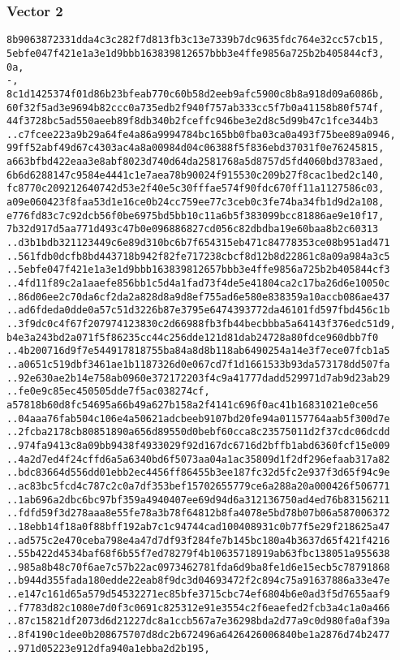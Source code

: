 \documentclass[
]{article}
\begin{document}
\hypertarget{vector-2-2}{%
\subsubsection{Vector 2}\label{vector-2-2}}

\begin{verbatim}
8b9063872331dda4c3c282f7d813fb3c13e7339b7dc9635fdc764e32cc57cb15,
5ebfe047f421e1a3e1d9bbb163839812657bbb3e4ffe9856a725b2b405844cf3,
0a,
-,
8c1d1425374f01d86b23bfeab770c60b58d2eeb9afc5900c8b8a918d09a6086b,
60f32f5ad3e9694b82ccc0a735edb2f940f757ab333cc5f7b0a41158b80f574f,
44f3728bc5ad550aeeb89f8db340b2fceffc946be3e2d8c5d99b47c1fce344b3
..c7fcee223a9b29a64fe4a86a9994784bc165bb0fba03ca0a493f75bee89a0946,
99ff52abf49d67c4303ac4a8a00984d04c06388f5f836ebd37031f0e76245815,
a663bfbd422eaa3e8abf8023d740d64da2581768a5d8757d5fd4060bd3783aed,
6b6d6288147c9584e4441c1e7aea78b90024f915530c209b27f8cac1bed2c140,
fc8770c209212640742d53e2f40e5c30fffae574f90fdc670ff11a1127586c03,
a09e060423f8faa53d1e16ce0b24cc759ee77c3ceb0c3fe74ba34fb1d9d2a108,
e776fd83c7c92dcb56f0be6975bd5bb10c11a6b5f383099bcc81886ae9e10f17,
7b32d917d5aa771d493c47b0e096886827cd056c82dbdba19e60baa8b2c60313
..d3b1bdb321123449c6e89d310bc6b7f654315eb471c84778353ce08b951ad471
..561fdb0dcfb8bd443718b942f82fe717238cbcf8d12b8d22861c8a09a984a3c5
..5ebfe047f421e1a3e1d9bbb163839812657bbb3e4ffe9856a725b2b405844cf3
..4fd11f89c2a1aaefe856bb1c5d4a1fad73f4de5e41804ca2c17ba26d6e10050c
..86d06ee2c70da6cf2da2a828d8a9d8ef755ad6e580e838359a10accb086ae437
..ad6fdeda0dde0a57c51d3226b87e3795e6474393772da46101fd597fbd456c1b
..3f9dc0c4f67f207974123830c2d66988fb3fb44becbbba5a64143f376edc51d9,
b4e3a243bd2a071f5f86235cc44c256dde121d81dab24728a80fdce960dbb7f0
..4b200716d9f7e544917818755ba84a8d8b118ab6490254a14e3f7ece07fcb1a5
..a0651c519dbf3461ae1b1187326d0e067cd7f1d1661533b93da573178dd507fa
..92e630ae2b14e758ab0960e372172203f4c9a41777dadd529971d7ab9d23ab29
..fe0e9c85ec450505dde7f5ac038274cf,
a57818b60d8fc54695a66b49a627b158a2f4141c696f0ac41b16831021e0ce56
..04aaa76fab504c106e4a50621adcbeeb9107bd20fe94a01157764aab5f300d7e
..2fcba2178cb80851890a656d89550d0bebf60cca8c23575011d2f37cdc06dcdd
..974fa9413c8a09bb9438f4933029f92d167dc6716d2bffb1abd6360fcf15e009
..4a2d7ed4f24cffd6a5a6340bd6f5073aa04a1ac35809d1f2df296efaab317a82
..bdc83664d556dd01ebb2ec4456ff86455b3ee187fc32d5fc2e937f3d65f94c9e
..ac83bc5fcd4c787c2c0a7df353bef15702655779ce6a288a20a000426f506771
..1ab696a2dbc6bc97bf359a4940407ee69d94d6a312136750ad4ed76b83156211
..fdfd59f3d278aaa8e55fe78a3b78f64812b8fa4078e5bd78b07b06a587006372
..18ebb14f18a0f88bff192ab7c1c94744cad100408931c0b77f5e29f218625a47
..ad575c2e470ceba798e4a47d7df93f284fe7b145bc180a4b3637d65f421f4216
..55b422d4534baf68f6b55f7ed78279f4b10635718919ab63fbc138051a955638
..985a8b48c70f6ae7c57b22ac0973462781fda6d9ba8fe1d6e15ecb5c78791868
..b944d355fada180edde22eab8f9dc3d04693472f2c894c75a91637886a33e47e
..e147c161d65a579d54532271ec85bfe3715cbc74ef6804b6e0ad3f5d7655aaf9
..f7783d82c1080e7d0f3c0691c825312e91e3554c2f6eaefed2fcb3a4c1a0a466
..87c15821df2073d6d21227dc8a1ccb567a7e36298bda2d77a9c0d980fa0af39a
..8f4190c1dee0b208675707d8dc2b672496a6426426006840be1a2876d74b2477
..971d05223e912dfa940a1ebba2d2b195,
\end{verbatim}
\end{document}
